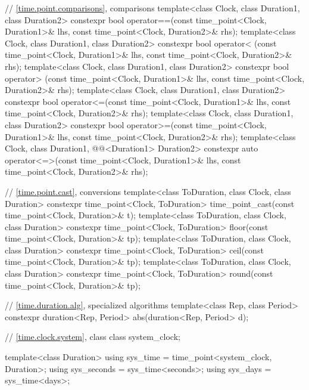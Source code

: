 \begin{codeblock}
{{    // \ref{time.point.comparisons},  comparisons
    template<class Clock, class Duration1, class Duration2>
       constexpr bool operator==(const time_point<Clock, Duration1>& lhs,
                                 const time_point<Clock, Duration2>& rhs);
    template<class Clock, class Duration1, class Duration2>
       constexpr bool operator< (const time_point<Clock, Duration1>& lhs,
                                 const time_point<Clock, Duration2>& rhs);
    template<class Clock, class Duration1, class Duration2>
       constexpr bool operator> (const time_point<Clock, Duration1>& lhs,
                                 const time_point<Clock, Duration2>& rhs);
    template<class Clock, class Duration1, class Duration2>
       constexpr bool operator<=(const time_point<Clock, Duration1>& lhs,
                                 const time_point<Clock, Duration2>& rhs);
    template<class Clock, class Duration1, class Duration2>
       constexpr bool operator>=(const time_point<Clock, Duration1>& lhs,
                                 const time_point<Clock, Duration2>& rhs);
    template<class Clock, class Duration1, @@<Duration1> Duration2>
       constexpr auto operator<=>(const time_point<Clock, Duration1>& lhs,
                                  const time_point<Clock, Duration2>& rhs);

    // \ref{time.point.cast}, conversions
    template<class ToDuration, class Clock, class Duration>
      constexpr time_point<Clock, ToDuration>
        time_point_cast(const time_point<Clock, Duration>& t);
    template<class ToDuration, class Clock, class Duration>
      constexpr time_point<Clock, ToDuration> floor(const time_point<Clock, Duration>& tp);
    template<class ToDuration, class Clock, class Duration>
      constexpr time_point<Clock, ToDuration> ceil(const time_point<Clock, Duration>& tp);
    template<class ToDuration, class Clock, class Duration>
      constexpr time_point<Clock, ToDuration> round(const time_point<Clock, Duration>& tp);

    // \ref{time.duration.alg}, specialized algorithms
    template<class Rep, class Period>
      constexpr duration<Rep, Period> abs(duration<Rep, Period> d);

    // \ref{time.clock.system}, class 
    class system_clock;

    template<class Duration>
      using sys_time  = time_point<system_clock, Duration>;
    using sys_seconds = sys_time<seconds>;
    using sys_days    = sys_time<days>;

}}
\end{codeblock}
